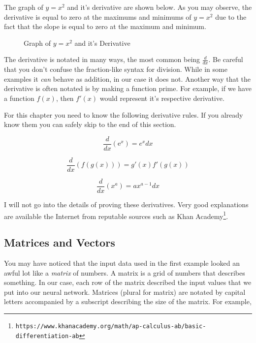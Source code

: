 \documentclass{memoir}
\newcommand{\ddx}{ \frac{d}{dx} }
\newcommand{\e}{\text{e}}
\begin{document}
The graph of $y=x^2$ and it's derivative are shown below. As you may observe, the derivative is equal to zero at the maximums and minimums of $y=x^2$ due to the fact that the slope is equal to zero at the maximum and minimum.

\begin{figure}[h]
	\centering
  \caption{Graph of $y=x^2$ and it's Derivative}
\end{figure}

The derivative is notated in many ways, the most common being $\ddx$. Be careful that you don't confuse the fraction-like syntax for division. While in some examples it \emph{can} behave as addition, in our case it does not. Another way that the derivative is often notated is by making a function prime. For example, if we have a function $f(x)$, then $f'(x)$ would represent it's respective derivative.

For this chapter you need to know the following derivative rules. If you already know them you can safely skip to the end of this section. \\

\begin{center}
	\vspace{-1cm}
	\begin{minipage}[b]{0.31\textwidth}
		\[\ddx(\e^x) = e^xdx\]
	\end{minipage}\hfill
	\begin{minipage}[b]{0.37\textwidth}
		\[\ddx(f(g(x))) = g'(x)f'(g(x))\]
	\end{minipage}\hfill
	\begin{minipage}[b]{0.31\textwidth}
		\[\ddx(x^a) = ax^{a-1}dx\]
	\end{minipage}
\end{center}

I will not go into the details of proving these derivatives. Very good explanations are available the Internet from reputable sources such as Khan Academy\footnote{\texttt{https://www.khanacademy.org/math/ap-calculus-ab/basic-differentiation-ab}}.
\subsection{Matrices and Vectors}
You may have noticed that the input data used in the first example looked an awful lot like a \emph{matrix} of numbers. A matrix is a grid of numbers that describes something. In our case, each row of the matrix described the input values that we put into our neural network. Matrices (plural for matrix) are notated by capital letters accompanied by a subscript describing the size of the matrix. For example,
\end{document}
